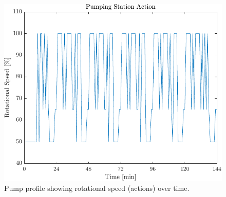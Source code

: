 \begin{figure}[h!]
	\centering
	\includegraphics[width=0.7\linewidth]{figures/ResultPumpSpeed.pdf}
	\caption{Pump profile showing rotational speed (actions) over time.}
	\label{fig:PumpResult}
\end{figure}

